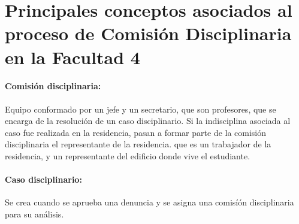 \section[Conceptos]{Principales conceptos asociados al proceso de Comisión Disciplinaria en la Facultad 4} 

\paragraph{Comisión disciplinaria:}
Equipo conformado por un jefe y un secretario,  que son profesores, que se encarga de la resolución de un caso disciplinario. Si la indisciplina asociada al caso fue realizada en la residencia, pasan a formar parte de la comisión disciplinaria el representante de la residencia. que es un trabajador de la residencia, y un representante del edificio donde vive el estudiante.

\paragraph{Caso disciplinario:} Se crea cuando se aprueba una denuncia y se asigna una comisíón disciplinaria para su análisis.
